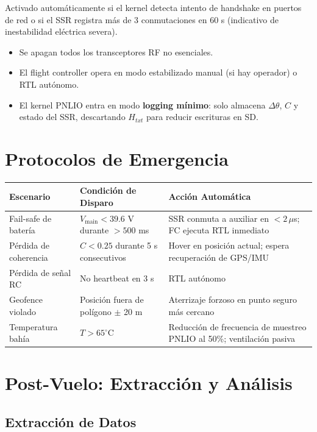 Activado automáticamente si el kernel detecta intento de handshake en puertos de red o si el SSR registra más de 3 conmutaciones en 60 s (indicativo de inestabilidad eléctrica severa).

\begin{itemize}
    \item Se apagan todos los transceptores RF no esenciales.
    \item El flight controller opera en modo estabilizado manual (si hay operador) o RTL autónomo.
    \item El kernel PNLIO entra en modo \textbf{logging mínimo}: solo almacena $\Delta\theta$, $C$ y estado del SSR, descartando $H_{txt}$ para reducir escrituras en SD.
\end{itemize}

\section{Protocolos de Emergencia}

\begin{table}[h]
\centering
\begin{tabular}{|p{3.5cm}|p{5cm}|p{5cm}|}
\hline
\textbf{Escenario} & \textbf{Condición de Disparo} & \textbf{Acción Automática} \\ \hline
Fail-safe de batería & $V_{\text{main}} < 39.6$ V durante $> 500$ ms & SSR conmuta a auxiliar en $<2\,\mu$s; FC ejecuta RTL inmediato \\ \hline
Pérdida de coherencia & $C < 0.25$ durante 5 s consecutivos & Hover en posición actual; espera recuperación de GPS/IMU \\ \hline
Pérdida de señal RC & No heartbeat en 3 s & RTL autónomo \\ \hline
Geofence violado & Posición fuera de polígono $\pm$ 20 m & Aterrizaje forzoso en punto seguro más cercano \\ \hline
Temperatura bahía & $T > 65^\circ$C & Reducción de frecuencia de muestreo PNLIO al 50\%; ventilación pasiva \\ \hline
\end{tabular}
\end{table}

\section{Post-Vuelo: Extracción y Análisis}

\subsection{Extracción de Datos}

